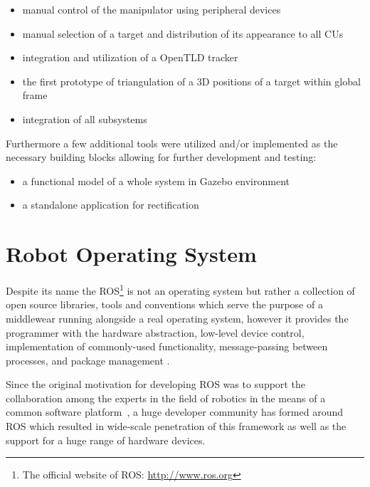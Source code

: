 \begin{itemize}
	\item manual control of the manipulator using peripheral devices
	\item manual selection of a target and distribution of its appearance to all CUs
	\item integration and utilization of a OpenTLD tracker
	\item the first prototype of triangulation of a 3D positions of a target within global frame
	\item integration of all subsystems
\end{itemize}

Furthermore a few additional tools were utilized and/or implemented as the necessary building blocks allowing for further development and testing:

\begin{itemize}
	\item a functional model of a whole system in Gazebo environment
	\item a standalone application for rectification
\end{itemize}


\section{Robot Operating System} \label{txt:robot_operating_system}

Despite its name the ROS\footnote{The official website of ROS: \url{http://www.ros.org}} is not an operating system but rather a collection of open source libraries, tools and conventions which serve the purpose of a middlewear running alongside a real operating system, however it provides the programmer with the hardware abstraction,  low-level device control, implementation of commonly-used functionality,
message-passing between processes, and package management \cite{O'Kane201310}.

Since the original motivation for developing ROS was to support the collaboration among the experts in the field of robotics in the means of a common software platform~\cite{ROS-an-open-source-Robot-Operating-System}, a huge developer community has formed around ROS which resulted in wide-scale penetration of this framework as well as the support for a huge range of hardware devices.


